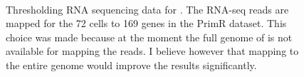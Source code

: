 \begin{figure}[H]
        \myfloatalign
         \\
        \caption{Thresholding RNA sequencing data for \platy{}. The RNA-seq reads are mapped for the 72 cells to 169 genes in the PrimR dataset. This choice was made because at the moment the full genome of \platy{} is not available for mapping the reads. I believe however that mapping to the entire genome would improve the results significantly.}\label{fig:platynereis_single_cell}
\end{figure}
  
